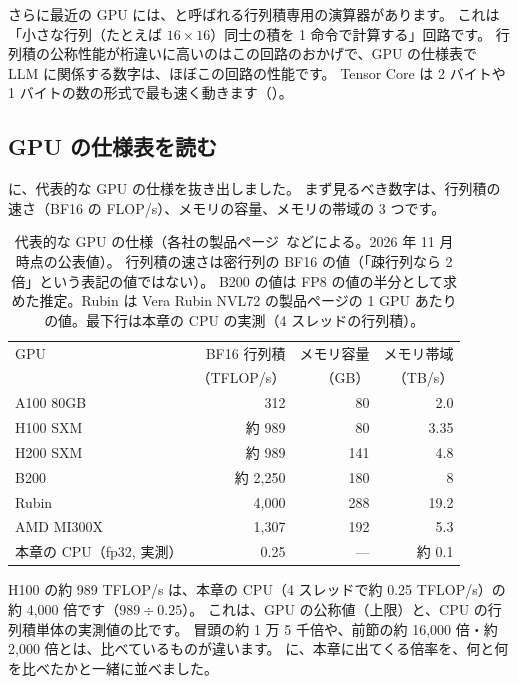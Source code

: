 さらに最近の GPU には、と呼ばれる行列積専用の演算器があります。
これは「小さな行列（たとえば $16\times16$）同士の積を 1 命令で計算する」回路です。
行列積の公称性能が桁違いに高いのはこの回路のおかげで、GPU の仕様表で LLM に関係する数字は、ほぼこの回路の性能です。
Tensor Core は 2 バイトや 1 バイトの数の形式で最も速く動きます（）。

\subsection*{GPU の仕様表を読む}

に、代表的な GPU の仕様を抜き出しました。
まず見るべき数字は、行列積の速さ（BF16 の FLOP/s）、メモリの容量、メモリの帯域の 3 つです。

\begin{table}[!tbp]
\centering
\caption{代表的な GPU の仕様（各社の製品ページ~\cite{nvidia2026h100,nvidia2026h200,amd2026mi300x}などによる。2026 年 11 月時点の公表値）。
行列積の速さは密行列の BF16 の値（「疎行列なら 2 倍」という表記の値ではない）。
B200 の値は FP8 の値の半分として求めた推定。Rubin は Vera Rubin NVL72 の製品ページの 1 GPU あたりの値。最下行は本章の CPU の実測（4 スレッドの行列積）。}
\label{tab:gpu-specs}
\small
\begin{tabular}{lrrr}
\toprule
GPU & BF16 行列積 & メモリ容量 & メモリ帯域 \\
 & （TFLOP/s） & （GB） & （TB/s） \\
\midrule
A100 80GB & 312 & 80 & 2.0 \\
H100 SXM & 約 989 & 80 & 3.35 \\
H200 SXM & 約 989 & 141 & 4.8 \\
B200 & 約 2,250 & 180 & 8 \\
Rubin & 4,000 & 288 & 19.2 \\
AMD MI300X & 1,307 & 192 & 5.3 \\
\midrule
本章の CPU（fp32, 実測） & 0.25 & — & 約 0.1 \\
\bottomrule
\end{tabular}
\end{table}

H100 の約 989 TFLOP/s は、本章の CPU（4 スレッドで約 0.25 TFLOP/s）の約 4,000 倍です（$989\div0.25$）。
これは、GPU の公称値（上限）と、CPU の行列積単体の実測値の比です。
冒頭の約 1 万 5 千倍や、前節の約 16,000 倍・約 2,000 倍とは、比べているものが違います。
に、本章に出てくる倍率を、何と何を比べたかと一緒に並べました。

